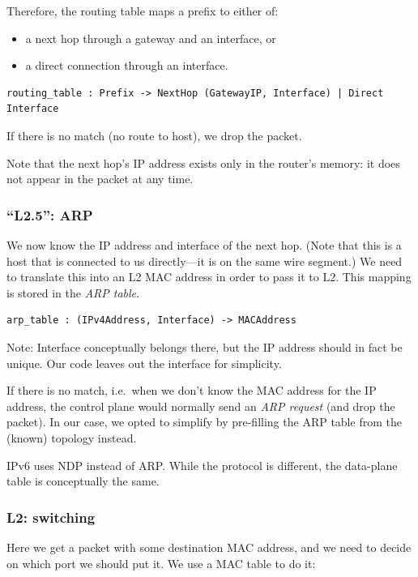 \documentclass[11pt,oneside,a4paper]{article}
\begin{document}
Therefore, the routing table maps a prefix to either of:
\begin{itemize}
\item a next hop through a gateway and an interface, or
\item a direct connection through an interface.
\end{itemize}

\begin{verbatim}
routing_table : Prefix -> NextHop (GatewayIP, Interface) | Direct Interface
\end{verbatim}

If there is no match (no route to host), we drop the packet.

Note that the next hop's IP address exists only in the router's memory: it does
not appear in the packet at any time.

\subsubsection{``L2.5'': ARP}
We now know the IP address and interface of the next hop.
(Note that this is a host that is connected to us directly---it is on the same
wire segment.)
We need to translate this into an L2 MAC address in order to pass it to L2.
This mapping is stored in the \emph{ARP table}.

\begin{verbatim}
arp_table : (IPv4Address, Interface) -> MACAddress
\end{verbatim}

Note: Interface conceptually belongs there, but the IP address should in fact be
unique.
Our code leaves out the interface for simplicity.

If there is no match, i.e.~when we don’t know the MAC address for the IP
address, the control plane would normally send an \emph{ARP request} (and drop
the packet).
In our case, we opted to simplify by pre-filling the ARP table from the (known)
topology instead.

IPv6 uses NDP instead of ARP.
While the protocol is different, the data-plane table is conceptually the same.

\subsubsection{L2: switching}

Here we get a packet with some destination MAC address, and we need to decide on
which port we should put it.
We use a MAC table to do it:
\end{document}
